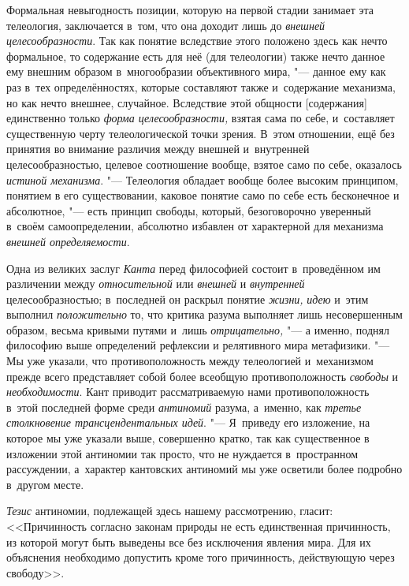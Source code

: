 Формальная невыгодность позиции, которую на первой стадии
занимает эта телеология, заключается в~том, что она доходит лишь до
{\em внешней целесообразности}.
Так как понятие вследствие этого положено здесь как нечто
формальное, то содержание есть для неё (для телеологии) также нечто данное
ему внешним образом в~многообразии объективного мира, "---
данное ему как раз в~тех определённостях, которые составляют
также и~содержание механизма, но как нечто внешнее, случайное. Вследствие
этой общности [содержания] единственно только
{\em форма целесообразности,}
взятая сама по себе, и~составляет существенную черту
телеологической точки зрения. В~этом отношении, ещё без принятия во
внимание различия между внешней и~внутренней целесообразностью, целевое
соотношение вообще, взятое само по себе, оказалось
{\em истиной механизма}. "---
Телеология обладает вообще более высоким принципом, понятием
в его существовании, каковое понятие само по себе есть бесконечное и
абсолютное, "--- есть принцип свободы, который, безоговорочно
уверенный в~своём самоопределении, абсолютно избавлен от характерной для
механизма {\em внешней определяемости}.

Одна из великих заслуг
{\em Канта} перед
философией состоит в~проведённом им различении между
{\em относительной} или
{\em внешней} и
{\em внутренней}
целесообразностью; в~последней он раскрыл понятие
{\em жизни,}
{\em идею} и~этим выполнил
{\em положительно} то,
что критика разума выполняет лишь несовершенным образом, весьма кривыми
путями и~лишь {\em отрицательно,} "---
а именно, поднял философию выше определений рефлексии и
релятивного мира метафизики. "--- Мы уже указали, что
противоположность между телеологией и~механизмом прежде всего представляет
собой более всеобщую противоположность
{\em свободы} и
{\em необходимости}. Кант
приводит рассматриваемую нами противоположность в~этой последней форме
среди {\em антиномий}
разума, а~именно, как
{\em третье столкновение
трансцендентальных идей}. "--- Я~приведу его изложение, на
которое мы уже указали выше, совершенно кратко, так как существенное в
изложении этой антиномии так просто, что не нуждается в~пространном
рассуждении, а~характер кантовских антиномий мы уже осветили
более подробно в~другом месте.

{\em Тезис} антиномии,
подлежащей здесь нашему рассмотрению, гласит: <<Причинность согласно законам
природы не есть единственная причинность, из которой могут быть выведены
все без исключения явления мира. Для их объяснения необходимо допустить
кроме того причинность, действующую через свободу>>.

